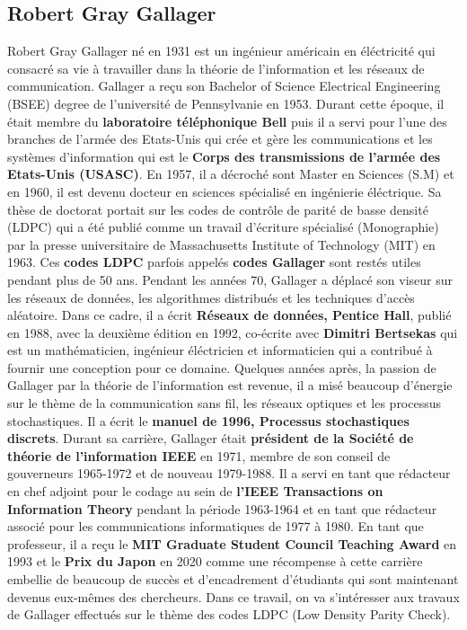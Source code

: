 \documentclass[french,nochapter,11pt]{rapportUB}
\begin{document}
\subsection{Robert Gray Gallager}
Robert Gray Gallager né en 1931 est un ingénieur américain en éléctricité qui consacré sa vie à travailler dans la théorie de l'information et les réseaux de communication. \newline
Gallager a reçu son Bachelor of Science Electrical Engineering (BSEE) degree de l'université de Pennsylvanie en 1953. Durant cette époque, il était membre du \textbf{laboratoire téléphonique Bell} puis il a servi pour l'une des branches de l'armée des Etats-Unis qui crée et gère les communications et les systèmes d'information qui est le \textbf{Corps des transmissions de l'armée des Etats-Unis (USASC)}. En 1957, il a décroché sont Master en Sciences (S.M) et en 1960, il est devenu docteur en sciences spécialisé en ingénierie éléctrique. \newline
Sa thèse de doctorat portait sur les codes de contrôle de parité de basse densité (LDPC) qui a été publié comme un travail d'écriture spécialisé (Monographie) par la presse universitaire de Massachusetts Institute of Technology (MIT) en 1963. Ces \textbf{codes LDPC} parfois appelés \textbf{codes Gallager} sont restés utiles pendant plus de 50 ans. \newline
Pendant les années 70, Gallager a déplacé son viseur sur les réseaux de données, les algorithmes distribués et les techniques d'accès aléatoire. Dans ce cadre, il a écrit \textbf{Réseaux de données, Pentice Hall}, publié en 1988, avec la deuxième édition en 1992, co-écrite avec \textbf{Dimitri Bertsekas} qui est un mathématicien, ingénieur éléctricien et informaticien qui a contribué à fournir une conception pour ce domaine. \newline
Quelques années après, la passion de Gallager par la théorie de l'information est revenue, il a misé beaucoup d'énergie sur le thème de la communication sans fil, les réseaux optiques et les processus stochastiques. Il a écrit le \textbf{manuel de 1996, Processus stochastiques discrets}.\newline
Durant sa carrière, Gallager était \textbf{président de la Société de théorie de l'information IEEE} en 1971, membre de son conseil de gouverneurs 1965-1972 et de nouveau 1979-1988. Il a servi en tant que rédacteur en chef adjoint pour le codage au sein de \textbf{l'IEEE Transactions on Information Theory} pendant la période 1963-1964 et en tant que rédacteur associé pour les communications informatiques de 1977 à 1980. \newline
En tant que professeur, il a reçu le \textbf{MIT Graduate Student Council Teaching Award} en 1993 et le \textbf{Prix du Japon} en 2020 comme une récompense à cette carrière embellie de beaucoup de succès et d'encadrement d'étudiants qui sont maintenant devenus eux-mêmes des chercheurs. \newline
Dans ce travail, on va s'intéresser aux travaux de Gallager effectués sur le thème des codes LDPC (Low Density Parity Check). \newline
\clearpage
\end{document}
